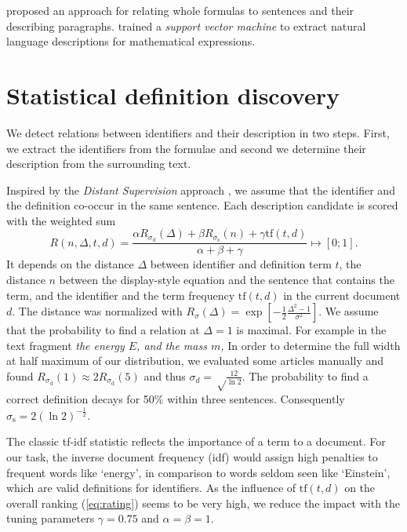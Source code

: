 \documentclass[runningheads]{llncs}
\begin{document}
\citeauthor{Quoc2010} \cite{Quoc2010} proposed an approach for
relating whole formulas to sentences and their describing paragraphs.
\citeauthor{Yokoi} \cite{Yokoi} trained a \emph{support vector machine} to extract
natural language descriptions for mathematical expressions.


\section{Statistical definition discovery}

We detect relations between identifiers and their description in two steps.
First, we extract the identifiers from the formulae and
second we determine their description from the surrounding text.

Inspired by the \emph{Distant Supervision} approach \cite{Mintz2008},
we assume that the identifier and the definition co-occur in the same sentence.
Each description candidate is scored with the weighted sum
\begin{equation} \label{eq:rating}
R(n,\Delta,t,d)=\frac{\alpha{R}_{\sigma_\mathrm d}(\Delta)
+\beta{R}_{\sigma_\mathrm s}(n)
+\gamma\mathrm{tf}(t,d)}{\alpha+\beta+\gamma} \mapsto [0;1].
\end{equation}
It depends on the distance $\Delta$ between identifier and definition term $t$, the distance $n$ between the display-style equation and the sentence that contains the term, and the identifier and the term frequency $\mathrm{tf}(t,d)$ in the current document $d$.
The distance was normalized with $R_\sigma(\Delta)= \exp\left[-\frac{1}{2}\frac{\Delta^2-1}{\sigma^2}\right].$
We assume that the probability to find a relation at $\Delta=1$ is maximal.  For example in the 
text fragment \emph{the energy $E$, and the mass $m$,}  
In order to determine the full width at half maximum of our distribution, we evaluated some articles manually and found $R_{\sigma_\mathrm d}(1)\approx 2 R_{\sigma_\mathrm d}(5)$ and thus 
$\sigma_d=\sqrt\frac{12}{\ln 2}$.
The probability to find a correct definition decays for 50\% within three sentences.
Consequently  $\sigma_\mathrm s=2\left({\ln 2}\right)^{-\frac{1}{2}}$.

The classic tf-idf \cite{Salton86} statistic reflects the importance of a term to a document.
For our task, the inverse document frequency (idf) would assign high penalties to 
frequent words like `energy', in comparison to 
words seldom seen like `Einstein', which are valid definitions for identifiers.
As the influence of $\mathrm{tf}(t,d)$ on the overall ranking (\ref{eq:rating}) seems to be very high, we reduce the impact with the tuning parameters $\gamma=0.75$ and $\alpha = \beta = 1$.
\end{document}
